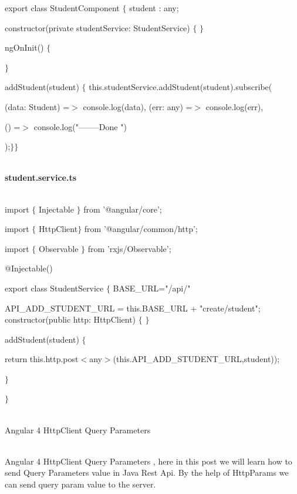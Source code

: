 \documentclass{article}
\begin{document}
\noindent export class StudentComponent $\mathrm{\{}$ student : any;

\noindent constructor(private studentService: StudentService) $\mathrm{\{}$ $\mathrm{\}}$

\noindent ngOnInit() $\mathrm{\{}$

\noindent $\mathrm{\}}$

\noindent addStudent(student) $\mathrm{\{}$ this.studentService.addStudent(student).subscribe(

\noindent (data: Student) =$\mathrm{>}$ console.log(data), (err: any) =$\mathrm{>}$ console.log(err),

\noindent () =$\mathrm{>}$ console.log("--------Done ")

\noindent );$\mathrm{\}}$$\mathrm{\}}$

\noindent \\ \textbf{student.service.ts}

\noindent 

\noindent \\ import $\mathrm{\{}$ Injectable $\mathrm{\}}$ from '@angular/core';

\noindent import $\mathrm{\{}$ HttpClient$\mathrm{\}}$ from '@angular/common/http'; 

\noindent import $\mathrm{\{}$ Observable $\mathrm{\}}$ from 'rxjs/Observable';

\noindent @Injectable()

\noindent export class StudentService $\mathrm{\{}$ BASE\_URL="/api/"

\noindent API\_ADD\_STUDENT\_URL = this.BASE\_URL + "create/student"; constructor(public http: HttpClient) $\mathrm{\{}$ $\mathrm{\}}$

\noindent addStudent(student) $\mathrm{\{}$

\noindent return this.http.post$\mathrm{<}$any$\mathrm{>}$(this.API\_ADD\_STUDENT\_URL,student));

\noindent $\mathrm{\}}$

\noindent $\mathrm{\}}$

\newpage

 


\noindent 

\noindent \\ Angular 4 HttpClient Query Parameters

\noindent 

\noindent \\ Angular 4 HttpClient Query Parameters , here in this post we will learn how to send Query Parameters value in Java Rest Api. By the help of HttpParams we can send query param value to the server. 
\end{document}
